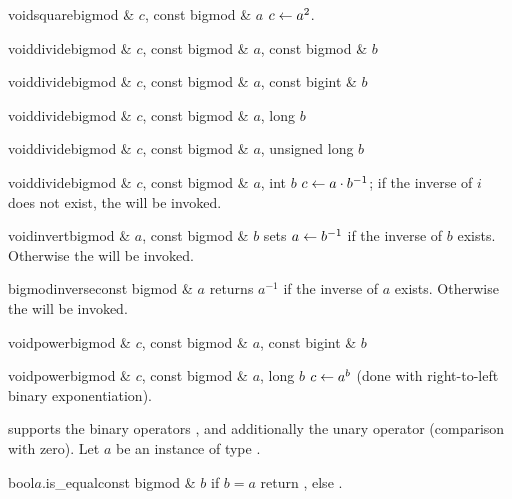 \begin{fcode}{void}{square}{bigmod & $c$, const bigmod & $a$}
  $c \leftarrow a^2$.
\end{fcode}

\begin{fcode}{void}{divide}{bigmod & $c$, const bigmod & $a$, const bigmod & $b$}\end{fcode}
\begin{fcode}{void}{divide}{bigmod & $c$, const bigmod & $a$, const bigint & $b$}\end{fcode}
\begin{fcode}{void}{divide}{bigmod & $c$, const bigmod & $a$, long $b$}\end{fcode}
\begin{fcode}{void}{divide}{bigmod & $c$, const bigmod & $a$, unsigned long $b$}\end{fcode}
\begin{fcode}{void}{divide}{bigmod & $c$, const bigmod & $a$, int $b$}
  $c \leftarrow a \cdot b^{-1}$; if the inverse of $i$ does not exist, the \LEH will be invoked.
\end{fcode}

\begin{fcode}{void}{invert}{bigmod & $a$, const bigmod & $b$}
  sets $a \leftarrow b^{-1}$ if the inverse of $b$ exists.  Otherwise the \LEH will be
  invoked.
\end{fcode}

\begin{fcode}{bigmod}{inverse}{const bigmod & $a$}
  returns $a^{-1}$ if the inverse of $a$ exists.  Otherwise the \LEH will be invoked.
\end{fcode}

\begin{fcode}{void}{power}{bigmod & $c$, const bigmod & $a$, const bigint & $b$}\end{fcode}
\begin{fcode}{void}{power}{bigmod & $c$, const bigmod & $a$, long $b$}
  $c \leftarrow a^b$ (done with right-to-left binary exponentiation).
\end{fcode}



\COMP

 supports the binary operators \code{==}, \code{!=} and additionally the
unary operator \code{!} (comparison with zero).  Let $a$ be an instance of type
.

\begin{cfcode}{bool}{$a$.is_equal}{const bigmod & $b$}
  if $b = a$ return \TRUE, else \FALSE.
\end{cfcode}

